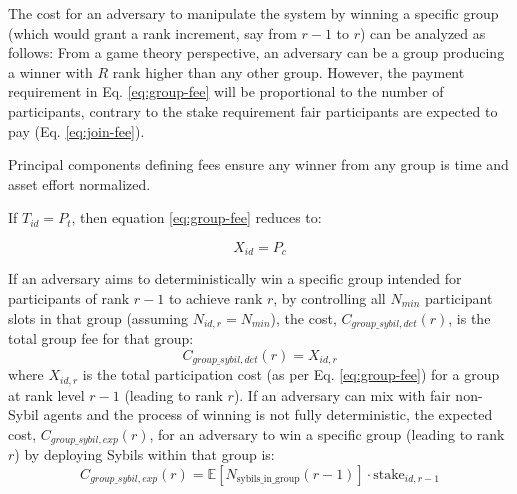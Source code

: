 \documentclass{article}
\begin{document}
\begin{CJK}{UTF8}{gbsn}
        The cost for an adversary to manipulate the system by winning a specific group (which would grant a rank increment, say from $r-1$ to $r$) can be analyzed as follows:
        From a game theory perspective, an adversary can be a group producing a winner with $R$ rank higher than any other group. However, the payment requirement in Eq. \ref{eq:group-fee} will be proportional to the number of participants, contrary to the stake requirement fair participants are expected to pay (Eq. \ref{eq:join-fee}).

        Principal components defining fees ensure any winner from any group is time and asset effort normalized.

        If $T_{id} = P_t$, then equation \ref{eq:group-fee} reduces to:

        \begin{equation}
            \label{eq:join-fee-2}
            X_{id} = P_c
        \end{equation}

        If an adversary aims to deterministically win a specific group intended for participants of rank $r-1$ to achieve rank $r$, by controlling all $N_{min}$ participant slots in that group (assuming $N_{id,r} = N_{min}$), the cost, $C_{group\_sybil,det}(r)$, is the total group fee for that group:
        \begin{equation}
            \label{eq:sybil_cost_one_group_deterministic}
            C_{group\_sybil,det}(r) = X_{id,r}
        \end{equation}
        where $X_{id,r}$ is the total participation cost (as per Eq. \ref{eq:group-fee}) for a group at rank level $r-1$ (leading to rank $r$).
        If an adversary can mix with fair non-Sybil agents and the process of winning is not fully deterministic, the expected cost, $C_{group\_sybil,exp}(r)$, for an adversary to win a specific group (leading to rank $r$) by deploying Sybils within that group is:
        \begin{equation}
            \label{eq:sybil_cost_one_group_expected}
            C_{group\_sybil,exp}(r) = \mathbb{E}[N_{\text{sybils\_in\_group}}(r-1)] \cdot \text{stake}_{id,r-1}
        \end{equation}



\end{CJK}
\end{document}
